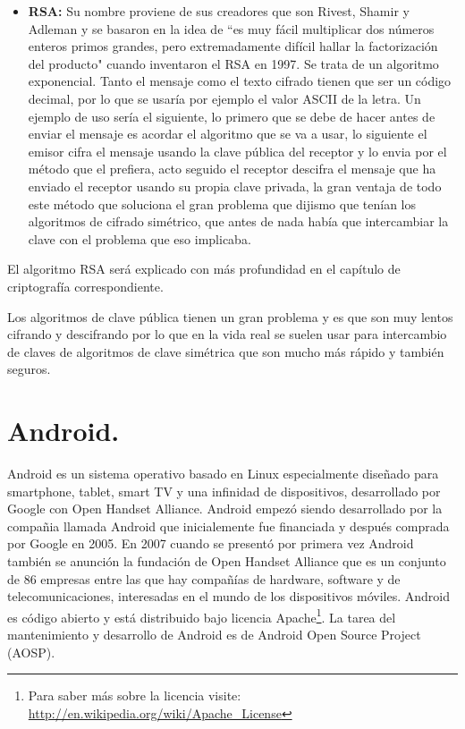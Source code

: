 \begin{itemize}

	\item \textbf{RSA:} Su nombre proviene de sus creadores que son Rivest, Shamir y Adleman y se basaron en la idea de ``es muy fácil multiplicar dos números enteros primos grandes, pero extremadamente difícil hallar la factorización del producto" cuando inventaron el RSA en 1997. Se trata de un algoritmo exponencial. Tanto el mensaje como el texto cifrado tienen que ser un código decimal, por lo que se usaría por ejemplo el valor ASCII de la letra. Un ejemplo de uso sería el siguiente, lo primero que se debe de hacer antes de enviar el mensaje es acordar el algoritmo que se va a usar, lo siguiente el emisor cifra el mensaje usando la clave pública del receptor y lo envia por el método que el prefiera, acto seguido el receptor descifra el mensaje que ha enviado el receptor usando su propia clave privada, la gran ventaja de todo este método que soluciona el gran problema que dijismo que tenían los algoritmos de cifrado simétrico, que antes de nada había que intercambiar la clave con el problema que eso implicaba. 

\end{itemize}

El algoritmo RSA será explicado con más profundidad en el capítulo de criptografía correspondiente.

Los algoritmos de clave pública tienen un gran problema y es que son muy lentos cifrando y descifrando por lo que en la vida real se suelen usar para intercambio de claves de algoritmos de clave simétrica que son mucho más rápido y también seguros.

\section{Android.}

Android es un sistema operativo basado en Linux especialmente diseñado para smartphone, tablet, smart TV y una infinidad de dispositivos, desarrollado por Google con Open Handset Alliance. Android empezó siendo desarrollado por la compañia llamada Android que inicialemente fue financiada y después comprada por Google en 2005. En 2007 cuando se presentó por primera vez Android también se anunción la fundación de Open Handset Alliance que es un conjunto de 86 empresas entre las que hay compañías de hardware, software y de telecomunicaciones, interesadas en el mundo de los dispositivos móviles. Android es código abierto y está distribuido bajo licencia Apache\footnote{Para saber más sobre la licencia visite: \url{http://en.wikipedia.org/wiki/Apache\_License}}. La tarea del mantenimiento y desarrollo de Android es de Android Open Source Project (AOSP).

